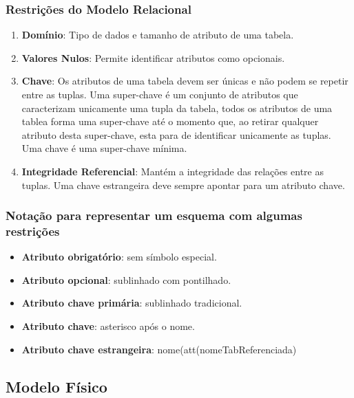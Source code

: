 \documentclass[ ]{article}
\begin{document}
		\subsubsection{Restrições do Modelo Relacional}
			\begin{enumerate}
				\item \textbf{Domínio}: Tipo de dados e tamanho de atributo de uma tabela.
				\item \textbf{Valores Nulos}:  Permite identificar atributos como opcionais.
				\item \textbf{Chave}: Os atributos de uma tabela devem ser únicas e não podem se repetir entre as tuplas. Uma super-chave é um conjunto de atributos que caracterizam unicamente uma tupla da tabela, todos os atributos de uma tablea forma uma super-chave até o momento que, ao retirar qualquer atributo desta super-chave, esta para de identificar unicamente as tuplas. Uma chave é uma super-chave mínima.
				\item \textbf{Integridade Referencial}: Mantém a integridade das relações entre as tuplas. Uma chave estrangeira deve sempre apontar para um atributo chave.
			\end{enumerate}
		\subsubsection{Notação para representar um esquema com algumas restrições}
			\begin{itemize}
				\item \textbf{Atributo obrigatório}: sem símbolo especial.
				\item \textbf{Atributo opcional}: sublinhado com pontilhado.
				\item \textbf{Atributo chave primária}: sublinhado tradicional.
				\item \textbf{Atributo chave}: asterisco após o nome.
				\item \textbf{Atributo chave estrangeira}: nome(att(nomeTabReferenciada)
			\end{itemize}
	\subsection{Modelo Físico}
\end{document}
